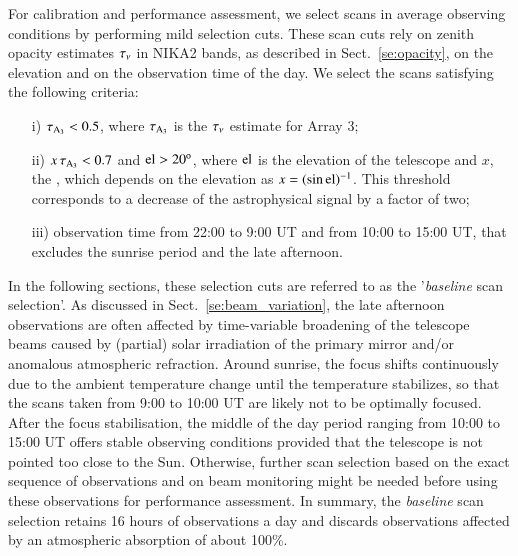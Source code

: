 For calibration and performance assessment, we select scans in average
observing conditions by performing mild selection cuts. These scan
cuts rely on zenith opacity estimates $\tau_{\nu}$ in NIKA2 bands, as
described in Sect.~\ref{se:opacity}, on the elevation and on the
observation time of the day. We select the scans satisfying the
following criteria:
%
\begin{itemize}
\item[i)] $\tau_{\rm{A_3}} < 0.5$, where $\tau_{\rm{A_3}}$ is the $\tau_{\nu}$ estimate for
  Array 3; %
\item[ii)] $x\, \tau_{\rm{A_3}} < 0.7$ and $\rm{el} > 20^{o}$, where $\rm{el}$ is the
  elevation of the telescope and $x$, the
  \airmass, which depends on the elevation as $x=(\sin{\rm{el}})^{-1}$. This
  threshold corresponds to a decrease of the astrophysical signal by a
  factor of two;
\item[iii)] observation time from 22:00 to 9:00 UT and from 10:00 to
  15:00 UT, that excludes the sunrise period and the late afternoon.
\end{itemize}
%
{\lp In the following sections, these selection cuts are referred to as the 
'\emph{baseline} scan selection'.}  
As discussed in Sect.~\ref{se:beam_variation}, the late afternoon
observations are often affected by time-variable broadening of the
telescope beams caused by (partial) solar irradiation of the primary
mirror and/or anomalous atmospheric refraction.
Around sunrise, the focus shifts continuously due to the ambient temperature
change until the temperature stabilizes, so that the scans taken from
9:00 to 10:00 UT are likely not to be optimally focused.
After the focus stabilisation, the middle of the day period ranging
from 10:00 to 15:00 UT offers stable observing conditions
provided that the telescope is not pointed too
close to the Sun.
Otherwise, further scan selection based on
the exact sequence of observations and on beam monitoring might be
needed before using these observations for performance assessment.
{\lp In summary, the \emph{baseline} scan selection retains 16 hours of
observations a day and discards observations affected by an
atmospheric absorption of about 100\%.}  

